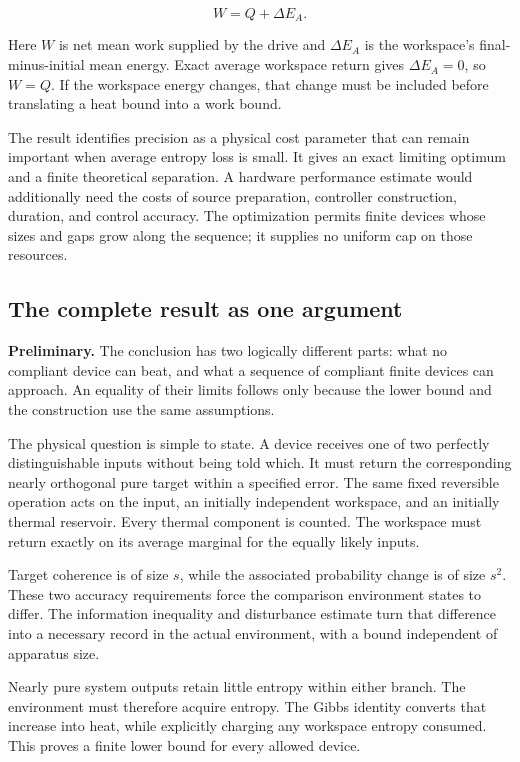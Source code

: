 \documentclass[11pt,letterpaper]{article}
\begin{document}
\[W = Q + \Delta E_{A}.\]

Here \(W\) is net mean work supplied by the drive and \(\Delta E_{A}\) is the workspace's final-minus-initial mean energy. Exact average workspace return gives \(\Delta E_{A} = 0\), so \(W = Q\). If the workspace energy changes, that change must be included before translating a heat bound into a work bound.

The result identifies precision as a physical cost parameter that can remain important when average entropy loss is small. It gives an exact limiting optimum and a finite theoretical separation. A hardware performance estimate would additionally need the costs of source preparation, controller construction, duration, and control accuracy. The optimization permits finite devices whose sizes and gaps grow along the sequence; it supplies no uniform cap on those resources.

\clearpage
\subsection{The complete result as one argument}\label{subsec:summary}

\textbf{Preliminary.} The conclusion has two logically different parts: what no compliant device can beat, and what a sequence of compliant finite devices can approach. An equality of their limits follows only because the lower bound and the construction use the same assumptions.

The physical question is simple to state. A device receives one of two perfectly distinguishable inputs without being told which. It must return the corresponding nearly orthogonal pure target within a specified error. The same fixed reversible operation acts on the input, an initially independent workspace, and an initially thermal reservoir. Every thermal component is counted. The workspace must return exactly on its average marginal for the equally likely inputs.

Target coherence is of size \(s\), while the associated probability change is of size \(s^{2}\). These two accuracy requirements force the comparison environment states to differ. The information inequality and disturbance estimate turn that difference into a necessary record in the actual environment, with a bound independent of apparatus size.

Nearly pure system outputs retain little entropy within either branch. The environment must therefore acquire entropy. The Gibbs identity converts that increase into heat, while explicitly charging any workspace entropy consumed. This proves a finite lower bound for every allowed device.
\end{document}
